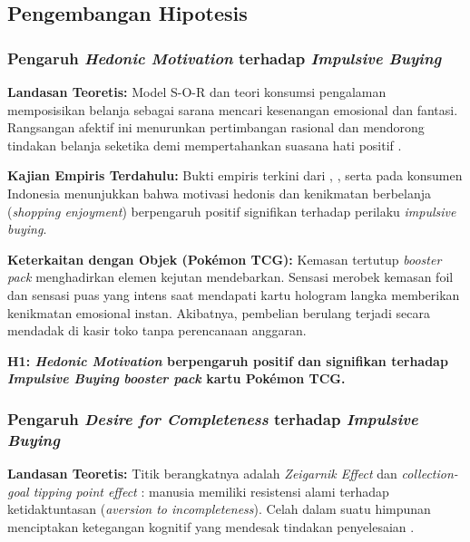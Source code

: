 \documentclass[12pt,a4paper]{article}
\numberwithin{equation}{section}
\numberwithin{table}{section}
\numberwithin{figure}{section}
\begin{document}
\subsection{Pengembangan Hipotesis}

\subsubsection{Pengaruh \emph{Hedonic Motivation} terhadap \emph{Impulsive Buying}}

\noindent\textbf{Landasan Teoretis:} Model S-O-R \citep{mehrabian1974approach} dan teori konsumsi pengalaman \citep{hirschman1982hedonic} memposisikan belanja sebagai sarana mencari kesenangan emosional dan fantasi. Rangsangan afektif ini menurunkan pertimbangan rasional dan mendorong tindakan belanja seketika demi mempertahankan suasana hati positif \citep{babin1994work}.

\noindent\textbf{Kajian Empiris Terdahulu:} Bukti empiris terkini dari \citet{pranggabayu2022pengaruh}, \citet{azizah2025exploring}, serta \citet{artadita2024how} pada konsumen Indonesia menunjukkan bahwa motivasi hedonis dan kenikmatan berbelanja (\emph{shopping enjoyment}) berpengaruh positif signifikan terhadap perilaku \emph{impulsive buying}.

\noindent\textbf{Keterkaitan dengan Objek (Pok\'emon TCG):} Kemasan tertutup \emph{booster pack} menghadirkan elemen kejutan mendebarkan. Sensasi merobek kemasan foil dan sensasi puas yang intens saat mendapati kartu hologram langka memberikan kenikmatan emosional instan. Akibatnya, pembelian berulang terjadi secara mendadak di kasir toko tanpa perencanaan anggaran.

\vspace{0.2cm}
\textbf{H1: \emph{Hedonic Motivation} berpengaruh positif dan signifikan terhadap \emph{Impulsive Buying} \emph{booster pack} kartu Pok\'emon TCG.}

\subsubsection{Pengaruh \emph{Desire for Completeness} terhadap \emph{Impulsive Buying}}

\noindent\textbf{Landasan Teoretis:} Titik berangkatnya adalah \emph{Zeigarnik Effect} \citep{zeigarnik1927behalten} dan \emph{collection-goal tipping point effect} \citep{gao2014completing}: manusia memiliki resistensi alami terhadap ketidaktuntasan (\emph{aversion to incompleteness}). Celah dalam suatu himpunan menciptakan ketegangan kognitif yang mendesak tindakan penyelesaian \citep{belk1995collecting, barasz2017pseudo}.
\end{document}

